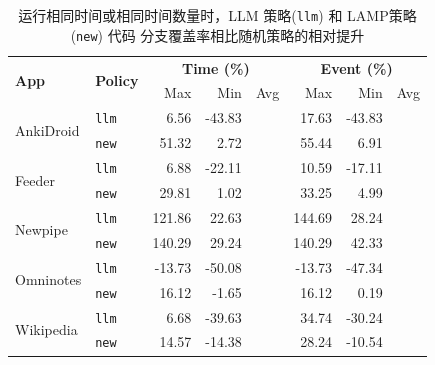 \documentclass[twocolumn, 10pt]{article}
\newcommand{\lamp}{L{\small\MakeUppercase{amp}}}
\begin{document}
\begin{table}[ht]
\centering
\small
\begin{tabular}{llrrrrrr}
\toprule
\multirow{2}{*}{\textbf{App}} & \multirow{2}{*}{\textbf{Policy}} & \multicolumn{3}{c}{\textbf{Time (\%)}} & \multicolumn{3}{c}{\textbf{Event (\%)}} \\
\cmidrule(lr){3-5} \cmidrule(lr){6-8}
& & Max & Min & Avg & Max & Min & Avg \\
\midrule

\multirow{2}{*}{AnkiDroid} 
    & \texttt{llm}  & 6.56  & {-43.83} & \cellcolor{gray!20}{-18.69} & 17.63 & {-43.83} & \cellcolor{gray!20}{-10.45} \\
    & \texttt{new}  & {51.32} & {2.72}   & \cellcolor{gray!20}{32.22}  & {55.44} & {6.91}   & \cellcolor{gray!20}{36.28}  \\
\midrule

\multirow{2}{*}{Feeder} 
    & \texttt{llm}  & 6.88  & {-22.11} & \cellcolor{gray!20}{-15.54} & 10.59 & {-17.11} & \cellcolor{gray!20}{-11.76} \\
    & \texttt{new}  & {29.81} & {1.02}   & \cellcolor{gray!20}{15.87}  & {33.25} & {4.99}   & \cellcolor{gray!20}{22.54}  \\
\midrule

\multirow{2}{*}{Newpipe} 
    & \texttt{llm}  & {121.86} & {22.63}  & \cellcolor{gray!20}{32.71}  & 144.69 & 28.24  & \cellcolor{gray!20}{41.09}  \\
    & \texttt{new}  & {140.29} & {29.24}  & \cellcolor{gray!20}{44.10}  & {140.29} & {42.33}  & \cellcolor{gray!20}{51.83}  \\
\midrule

\multirow{2}{*}{Omninotes} 
    & \texttt{llm}  & -13.73 & {-50.08} & \cellcolor{gray!20}{-39.31} & -13.73 & {-47.34} & \cellcolor{gray!20}{-35.73} \\
    & \texttt{new}  & {16.12}  & {-1.65}  & \cellcolor{gray!20}{3.55}   & {16.12}  & {0.19}   & \cellcolor{gray!20}{9.44}   \\
\midrule

\multirow{2}{*}{Wikipedia} 
    & \texttt{llm}  & 6.68   & {-39.63} & \cellcolor{gray!20}{-15.34} & {34.74}  & -30.24 & \cellcolor{gray!20}{-0.58}  \\
    & \texttt{new}  & {14.57}  & {-14.38} & \cellcolor{gray!20}{1.97}   & 28.24  & {-10.54} & \cellcolor{gray!20}{17.27}  \\
\bottomrule
\end{tabular}
\caption{运行相同时间或相同时间数量时，LLM 策略(\texttt{llm}) 和 \lamp 策略(\texttt{new}) 代码 分支覆盖率相比随机策略的相对提升}
\label{tab:branch-coverage-improvement}
\end{table}
\end{document}
